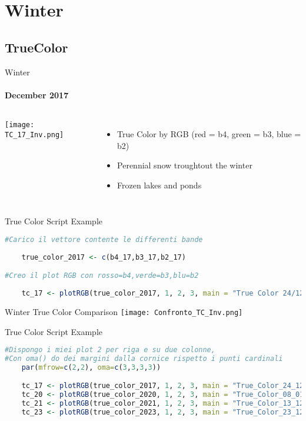 \documentclass[10pt]{beamer}
\begin{document}
\section{Winter}
\subsection{TrueColor}
\begin{frame}{Winter}
    \framesubtitle{December 2017}
    \begin{columns}
            \texttt{[image: TC\_17\_Inv.png]}
            \begin{itemize}
                \item<1-> True Color by RGB (red = b4, green = b3, blue = b2)
                \item<2-> Perennial snow troughtout the winter
                \item<3-> Frozen lakes and ponds
            \end{itemize}
    \end{columns}
\end{frame}
\begin{frame}[fragile]{True Color Script Example}
    \begin{lstlisting}[language=R]
#Carico il vettore contente le differenti bande
    
    true_color_2017 <- c(b4_17,b3_17,b2_17)

#Creo il plot RGB con rosso=b4,verde=b3,blu=b2
    
    tc_17 <- plotRGB(true_color_2017, 1, 2, 3, main = "True Color 24/12/17 Bayan-Unjuul")
    \end{lstlisting}
\end{frame}
\begin{frame}{Winter True Color Comparison}
    \centering
    \texttt{[image: Confronto\_TC\_Inv.png]}  
\end{frame}
\begin{frame}[fragile]{True Color Script Example}
    \begin{lstlisting}[language=R]
#Dispongo i miei plot 2 per riga e su due colonne,
#Con oma() do dei margini dalla cornice rispetto i punti cardinali
    par(mfrow=c(2,2), oma=c(3,3,3,3))

    tc_17 <- plotRGB(true_color_2017, 1, 2, 3, main = "True_Color_24_12_17_BU")
    tc_20 <- plotRGB(true_color_2020, 1, 2, 3, main = "True_Color_08_01_20_BU")
    tc_21 <- plotRGB(true_color_2021, 1, 2, 3, main = "True_Color_13_12_21_BU")
    tc_23 <- plotRGB(true_color_2023, 1, 2, 3, main = "True_Color_23_12_23_BU")
    \end{lstlisting}
\end{frame}
\end{document}
